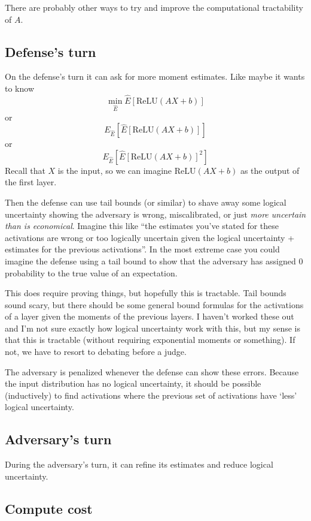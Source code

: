 \documentclass{pset}
\begin{document}
There are probably other ways to try and improve the computational tractability of $A$.

\subsection{Defense's turn}

On the defense's turn it can ask for more moment estimates.
Like maybe it wants to know 
\[\min_{\hat{E}} \hat{E}[\mathrm{ReLU}(A X + b)]\]
or
\[E_{\hat{E}}[ \hat{E}[\mathrm{ReLU}(A X + b)]]\]
or
\[E_{\hat{E}}[ \hat{E}[\mathrm{ReLU}(A X + b)]^2]\]
Recall that $X$ is the input, so we can imagine $\mathrm{ReLU}(A X + b)$ as the
output of the first layer.

Then the defense can use tail bounds (or similar) to shave away some logical
uncertainty showing the adversary is wrong, miscalibrated, or just \textit{more
uncertain than is economical}. Imagine this like ``the estimates you've stated
for these activations are wrong or too logically uncertain given the logical
uncertainty + estimates for the previous activations''. In the most extreme
case you could imagine the defense using a tail bound to show that the
adversary has assigned 0 probability to the true value of an expectation.

This does require proving things, but hopefully this is tractable. Tail bounds
sound scary, but there should be some general bound formulas for the
activations of a layer given the moments of the previous layers. I haven't
worked these out and I'm not sure exactly how logical uncertainty work with
this, but my sense is that this is tractable (without requiring exponential
moments or something). If not, we have to resort to debating before a judge.

The adversary is penalized whenever the defense can show these errors. Because
the input distribution has no logical uncertainty, it should be possible
(inductively) to find activations where the previous set of activations have
`less' logical uncertainty.

\subsection{Adversary's turn}

During the adversary's turn, it can refine its estimates and reduce logical uncertainty.

\subsection{Compute cost}
\end{document}
